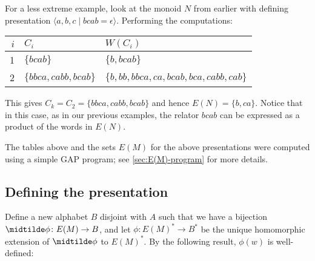 \documentclass[noindex,noinsetproof,12pt]{lmaths}
\begin{document}
\begin{example} \label{ex:monoidN}
	For a less extreme example, look at the monoid $N$ from earlier with defining presentation $\langle a, b, c \mid bcab = \epsilon\rangle$. Performing the computations:

	\begin{center}
	\renewcommand{\arraystretch}{1.2}
	\begin{tabular}{r|ll}
		$i$ & $C_i$ & $W(C_i)$ \\ \hline
		1 & $\{bcab\}$ & $\{b, bcab\}$ \\
		2 & $\{bbca, cabb, bcab\}$ & $\{b, bb, bbca, ca, bcab, bca, cabb, cab\}$
	\end{tabular}
	\end{center}

	This gives $C_k = C_2 = \{bbca, cabb, bcab\}$ and hence $E(N) = \{b, ca\}$. Notice that in this case, as in our previous examples, the relator $bcab$ can be expressed as a product of the words in $E(N)$.

\end{example}

The tables above and the sets $E(M)$ for the above presentations were computed using a simple GAP program; see \cref{sec:E(M)-program} for more details.


\subsection{Defining the presentation} \label{sec:defining-presentation}

Define a new alphabet $B$ disjoint with $A$ such that we have a bijection $\midtilde\phi \colon E(M) \to B$, and let $\phi \colon E(M)^* \to B^*$ be the unique homomorphic extension of $\midtilde\phi$ to $E(M)^*$. By the following result, $\phi(w)$ is well-defined:
\end{document}
